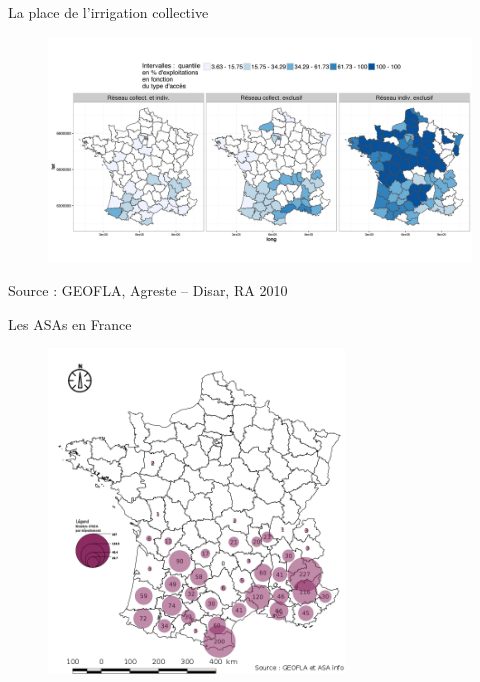 \documentclass[newPxFont]{beamer}
\begin{document}

\begin{frame}[c]{La place de l'irrigation collective}
\vspace{-2em}
\begin{figure}
	\centering
	\includegraphics[width = 1\textwidth]{img/nb_irrigant2}
\end{figure}
\small{Source : GEOFLA, Agreste -- Disar, RA 2010}

\end{frame}


\begin{frame}[c]{Les ASAs en France}
\vspace{-3em}
\begin{figure}
	\centering
	\includegraphics[width = 0.7\textwidth]{img/nbASA_dep}
\end{figure}


\end{frame}
\end{document}
